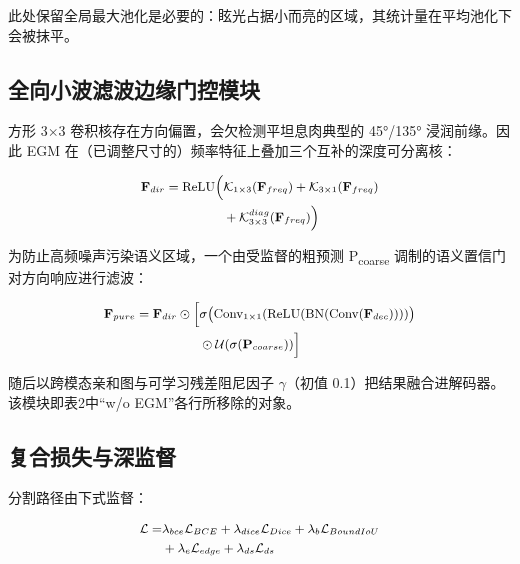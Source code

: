 \documentclass[conference]{IEEEtran}
\begin{document}
此处保留全局最大池化是必要的：眩光占据小而亮的区域，其统计量在平均池化下会被抹平。

\subsection{全向小波滤波边缘门控模块}

方形 3$\times$3 卷积核存在方向偏置，会欠检测平坦息肉典型的 45°/135° 浸润前缘。因此 EGM 在（已调整尺寸的）频率特征上叠加三个互补的深度可分离核：

\begin{equation}
\small
\begin{aligned}\mathbf{F}_{dir}=\mathrm{ReLU}\Big(&\mathcal{K}_{1\times3}(\mathbf{F}_{freq})+\mathcal{K}_{3\times1}(\mathbf{F}_{freq})\\&+\mathcal{K}_{3\times3}^{diag}(\mathbf{F}_{freq})\Big)\end{aligned}
\end{equation}

为防止高频噪声污染语义区域，一个由受监督的粗预测 P\textsubscript{coarse} 调制的语义置信门对方向响应进行滤波：

\begin{equation}
\small
\begin{aligned}\mathbf{F}_{pure}=\mathbf{F}_{dir}\odot\Big[&\sigma\big(\mathrm{Conv}_{1\times1}(\mathrm{ReLU}(\mathrm{BN}(\mathrm{Conv}(\mathbf{F}_{dec}))))\big)\\&\odot\mathcal{U}(\sigma(\mathbf{P}_{coarse}))\Big]\end{aligned}
\end{equation}

随后以跨模态亲和图与可学习残差阻尼因子 $\gamma$（初值 0.1）把结果融合进解码器。该模块即表2中“w/o EGM”各行所移除的对象。

\subsection{复合损失与深监督}

分割路径由下式监督：

\begin{equation}
\small
\begin{aligned}\mathcal{L}=&\lambda_{bce}\mathcal{L}_{BCE}+\lambda_{dice}\mathcal{L}_{Dice}+\lambda_{b}\mathcal{L}_{BoundIoU}\\&+\lambda_{e}\mathcal{L}_{edge}+\lambda_{ds}\mathcal{L}_{ds}\end{aligned}
\end{equation}
\end{document}
